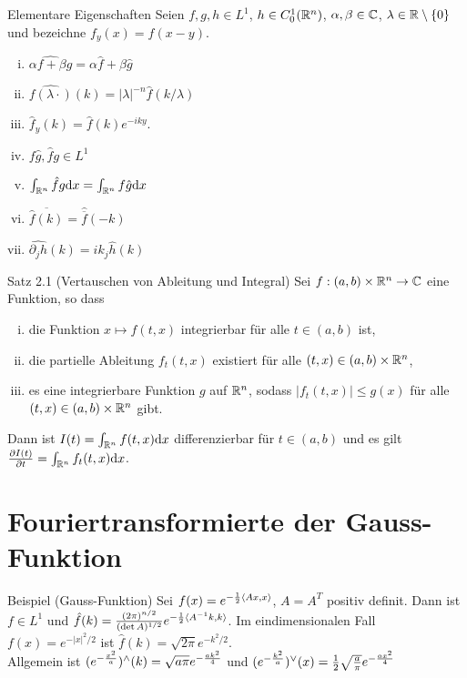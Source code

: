 \begin{namedtheorem}{Elementare Eigenschaften}
  Seien $f,g,h\in L^1$, $h\in C^1_0(\mathbb{R}^n)$, $\alpha,\beta \in \mathbb{C}$, $\lambda \in \mathbb{R} \setminus \{0\}$ und bezeichne $f_y(x) = f(x-y)$.
  {\setlength\multicolsep{4pt}%
  \begin{multicols}{2}
  \begin{enumerate}[(i)]
    \item $\widehat{\alpha f + \beta g} = \alpha\hat{f} + \beta\hat{g}$
    \item $\widehat{f(\lambda \cdot)}(k) = |\lambda|^{-n} \hat{f}(k/\lambda)$
    \item $\hat{f}_y(k) = \hat{f}(k)e^{-iky}$.
    \item $f\hat{g}, \hat{f}g \in L^1$
    \item $\int_{\mathbb{R}^n}\hat{f}g \mathrm{d} x = \int_{\mathbb{R}^n} f \hat{g} \mathrm{d} x$
    \item $\overline{\hat{f}(k)} = \hat{\overline{f}}(-k)$
    \item $\widehat{\partial_jh}(k)=ik_j\hat{h}(k)$
  \end{enumerate}
  \end{multicols}}
\end{namedtheorem}

\begin{namedtheorem}{Satz 2.1 (Vertauschen von Ableitung und Integral)}
  Sei $f: (a,b) \times \mathbb{R}^n \rightarrow \mathbb{C}$ eine Funktion, so dass 
  \begin{enumerate}[(i)]
    \item die Funktion $x\mapsto f(t,x)$ integrierbar für alle $t\in(a,b)$ ist,
    \item die partielle Ableitung $f_t(t,x)$ existiert für alle $(t,x)\in(a,b)\times\mathbb{R}^n$,
    \item es eine integrierbare Funktion $g$ auf $\mathbb{R}^n$, sodass $|f_t(t,x)|\leq g(x)$ für alle $(t,x)\in(a,b)\times\mathbb{R}^n$ gibt.
  \end{enumerate}
  Dann ist $I(t) = \int_{\mathbb{R}^n}f(t,x)\mathrm{d} x$ differenzierbar für $t\in(a,b)$ und es gilt $\frac{\partial I(t)}{\partial t} = \int_{\mathbb{R}^n} f_t(t,x)\mathrm{d} x$.
\end{namedtheorem}

\section{Fouriertransformierte der Gauss-Funktion}

\begin{namedtheorem}{Beispiel (Gauss-Funktion)}
  Sei $f(x)=e^{-\frac12\langle Ax,x \rangle}$, $A=A^T$ positiv definit. Dann ist $f\in L^1$ und $\hat{f}(k) = \frac{(2\pi)^{n/2}}{(\det A)^{1/2}} e^{-\frac12\langle A^{-1}k,k \rangle}$. Im eindimensionalen Fall $f(x) = e^{-|x|^2/2}$ ist $\hat{f}(k) = \sqrt{2\pi}e^{-k^2/2}$.\\
  Allgemein ist $(e^{-\frac{x^2}{a}}){}^{\wedge}(k) = \sqrt{a\pi}e^{-\frac{ak^2}{4}}$ und $(e^{-\frac{k^2}{a}}){}^{\vee}(x) = \frac{1}{2}\sqrt{\frac{a}{\pi}}e^{-\frac{ax^2}{4}}$
\end{namedtheorem}

